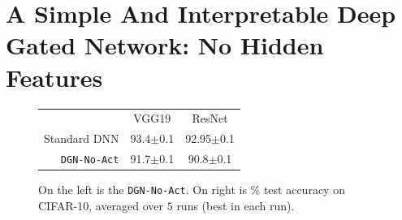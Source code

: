 \section{A Simple And Interpretable Deep Gated  Network: No Hidden Features}\label{sec:interpret}
\begin{figure}
\centering
\begin{minipage}{0.3\columnwidth}
\centering
{}
\end{minipage}
\begin{minipage}{0.4\columnwidth}
\begin{tabular}{rcc}
\toprule
&VGG19 & ResNet\\
Standard DNN&93.4\tiny{$\pm$0.1} &92.95\tiny{$\pm$0.1} \\
\texttt{DGN-No-Act}&91.7\tiny{$\pm$0.1}&90.8\tiny{$\pm$0.1} \\
\bottomrule
\end{tabular}
\end{minipage}
\caption{\small On the left is the \texttt{DGN-No-Act}. On right is $\%$ test accuracy on CIFAR-10, averaged over $5$ runs (best in each run).}
\label{fig:dgn-no-act}
\end{figure}

